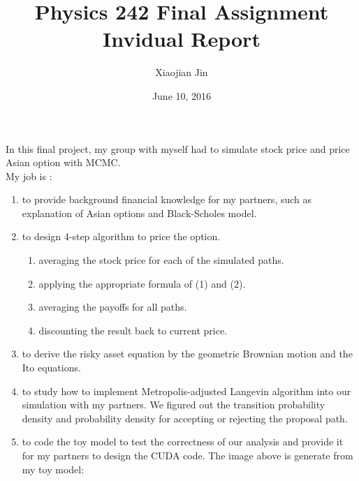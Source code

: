 \documentclass{article}
\title{Physics 242 Final Assignment\\Invidual Report}
\author{Xiaojian Jin}
\date{June 10, 2016}
\begin{document}
\maketitle

In this final project, my group with myself had to simulate stock price and price Asian option with MCMC.\\
My job is :\\
\begin{enumerate}
\item to provide background financial knowledge for my partners, such as explanation of Asian options and Black-Scholes model.
\item to design 4-step algorithm to price the option.
\begin{enumerate}
\item averaging the stock price for each of the simulated paths.
\item applying the appropriate formula of (1) and (2).
\item averaging the payoffs for all paths.
\item discounting the result back to current price.
\end{enumerate}
\item to derive the risky asset equation by the geometric Brownian motion and the Ito equations.
\item to study how to implement Metropolis-adjusted Langevin algorithm into our simulation with my partners. We figured out the transition probability density and probability density for accepting or rejecting the proposal path.
\item to code the toy model to test the correctness of our analysis and provide it for my partners to design the CUDA code. The image above is generate from my toy model:\\

\end{enumerate}
\end{document}
